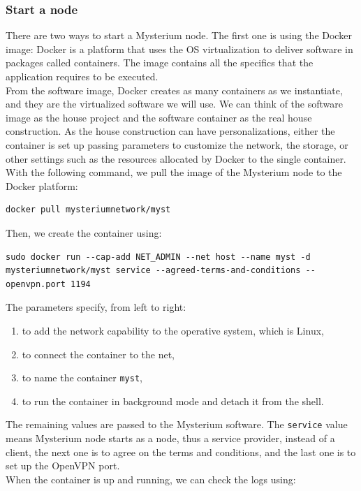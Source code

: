 \documentclass[12pt]{article}
\begin{document}
	\subsubsection{Start a node}
	There are two ways to start a Mysterium node. The first one is using the Docker image: Docker is a platform that uses the OS virtualization to deliver software in packages called containers. The image contains all the specifics that the application requires to be executed.\\
	From the software image, Docker creates as many containers as we instantiate, and they are the virtualized software we will use.  We can think of the software image as the house project and the software container as the real house construction. As the house construction can have personalizations, either the container is set up passing parameters to customize the network, the storage, or other settings such as the resources allocated by Docker to the single container.\\
	\bigbreak
	With the following command, we pull the image of the Mysterium node to the Docker platform:
	\begin{lstlisting}[frame=single]
		docker pull mysteriumnetwork/myst
	\end{lstlisting}
	
	Then, we create the container using:\\

	\begin{lstlisting}[frame=single]
		sudo docker run --cap-add NET_ADMIN --net host --name myst -d mysteriumnetwork/myst service --agreed-terms-and-conditions --openvpn.port 1194
	\end{lstlisting}

	The parameters specify, from left to right:
	\begin{enumerate}
		\item to add the network capability to the operative system, which is Linux,
		\item to connect the container to the net,
		\item to name the container \lstinline{myst},
		\item to run the container in background mode and detach it from the shell.
	\end{enumerate}

	The remaining values are passed to the Mysterium software. The \lstinline{service} value means Mysterium node starts as a node, thus a service provider, instead of a client, the next one is to agree on the terms and conditions, and the last one is to set up the OpenVPN port.\\
	When the container is up and running, we can check the logs using:
\end{document}
